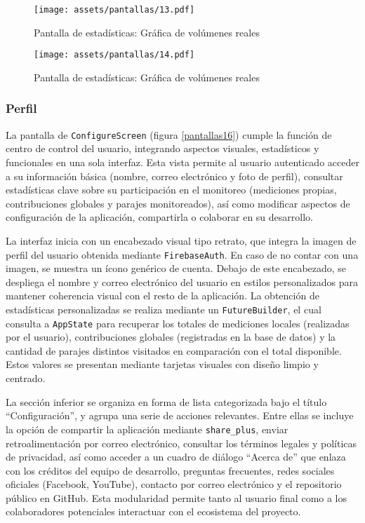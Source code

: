 \begin{figure}[h!]
\centering
  \texttt{[image: assets/pantallas/13.pdf]}
  \caption{Pantalla de estadísticas: Gráfica de volúmenes reales }
  \label{pantallas13}
\end{figure}


\begin{figure}[h!]
\centering
  \texttt{[image: assets/pantallas/14.pdf]}
  \caption{Pantalla de estadísticas: Gráfica de volúmenes reales }
  \label{pantallas14}
\end{figure}

\newpage
\subsubsection*{Perfil} 

La pantalla de \texttt{ConfigureScreen} (figura \ref{pantallas16}) cumple la función de centro de control del usuario, integrando aspectos visuales, estadísticos y funcionales en una sola interfaz. Esta vista permite al usuario autenticado acceder a su información básica (nombre, correo electrónico y foto de perfil), consultar estadísticas clave sobre su participación en el monitoreo (mediciones propias, contribuciones globales y parajes monitoreados), así como modificar aspectos de configuración de la aplicación, compartirla o colaborar en su desarrollo.

La interfaz inicia con un encabezado visual tipo retrato, que integra la imagen de perfil del usuario obtenida mediante \texttt{FirebaseAuth}. En caso de no contar con una imagen, se muestra un ícono genérico de cuenta. Debajo de este encabezado, se despliega el nombre y correo electrónico del usuario en estilos personalizados para mantener coherencia visual con el resto de la aplicación. La obtención de estadísticas personalizadas se realiza mediante un \texttt{FutureBuilder}, el cual consulta a \texttt{AppState} para recuperar los totales de mediciones locales (realizadas por el usuario), contribuciones globales (registradas en la base de datos) y la cantidad de parajes distintos visitados en comparación con el total disponible. Estos valores se presentan mediante tarjetas visuales con diseño limpio y centrado.

La sección inferior se organiza en forma de lista categorizada bajo el título ``Configuración'', y agrupa una serie de acciones relevantes. Entre ellas se incluye la opción de compartir la aplicación mediante \texttt{share\_plus}, enviar retroalimentación por correo electrónico, consultar los términos legales y políticas de privacidad, así como acceder a un cuadro de diálogo “Acerca de” que enlaza con los créditos del equipo de desarrollo, preguntas frecuentes, redes sociales oficiales (Facebook, YouTube), contacto por correo electrónico y el repositorio público en GitHub. Esta modularidad permite tanto al usuario final como a los colaboradores potenciales interactuar con el ecosistema del proyecto.

